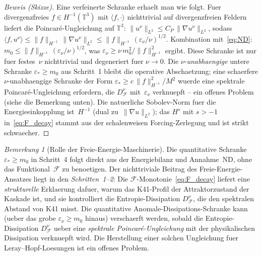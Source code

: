 \documentclass[12pt,a4paper]{article}
\theoremstyle{definition}
\theoremstyle{plain}
\theoremstyle{remark}
\newtheorem{remark}[definition]{Bemerkung}
\begin{document}
\begin{proof}[Beweis (Skizze)]
Eine verfeinerte Schranke erhaelt man wie folgt. Fuer divergenzfreies
$f \in H^{-1}(\mathbb{T}^3)$ mit $\langle f, \cdot\rangle$ nichttrivial
auf divergenzfreien Feldern liefert die Poincar\'e-Ungleichung auf
$\mathbb{T}^3$: $\|u^\nu\|_{L^2} \le C_P\,\|\nabla u^\nu\|_{L^2}$,
sodass
$\langle f, u^\nu \rangle
\le \|f\|_{H^{-1}}\,\|\nabla u^\nu\|_{L^2}
\le \|f\|_{H^{-1}}\,(\varepsilon_\nu/\nu)^{1/2}$.
Kombination mit~\eqref{eq:ND}:
$m_0 \le \|f\|_{H^{-1}}\,(\varepsilon_\nu/\nu)^{1/2}$, was
$\varepsilon_\nu \ge \nu\,m_0^2/\|f\|_{H^{-1}}^2$ ergibt. Diese
Schranke ist nur fuer festes~$\nu$ nichttrivial und degeneriert fuer
$\nu \to 0$.
Die $\nu$-\emph{unabhaengige} untere Schranke
$\varepsilon_* \ge m_0$ aus Schritt~1 bleibt die operative Abschaetzung;
eine schaerfere $\nu$-unabhaengige Schranke der Form
$\varepsilon_* \ge c\,\|f\|_{H^{-1}}^2 / M^2$
wuerde eine spektrale Poincar\'e-Ungleichung erfordern, die
$D_\mathcal{F}^\nu$ mit~$\varepsilon_\nu$ verknuepft -- ein offenes
Problem (siehe die Bemerkung unten).
Die natuerliche Sobolev-Norm fuer die Energieeinkopplung ist~$H^{-1}$
(dual zu~$\|\nabla u\|_{L^2}$); das $H^s$ mit $s > -1$
in~\eqref{eq:F_decay} stammt aus der schalenweisen Forcing-Zerlegung und
ist strikt schwaecher.

\end{proof}

\begin{remark}[Rolle der Freie-Energie-Maschinerie]
Die quantitative Schranke $\varepsilon_* \ge m_0$ in Schritt~4 folgt
direkt aus der Energiebilanz und Annahme~ND, ohne das
Funktional~$\mathcal{F}$ zu benoetigen. Der nichttriviale Beitrag des
Freie-Energie-Ansatzes liegt in den \emph{Schritten~1--2}: Die
$\mathcal{F}$-Monotonie~\eqref{eq:F_decay} liefert eine
\emph{strukturelle} Erklaerung dafuer, warum das K41-Profil der
Attraktorzustand der Kaskade ist, und sie kontrolliert die
Entropie-Dissipation $D_\mathcal{F}^\nu$, die den spektralen Abstand
von K41 misst. Die quantitative Anomale-Dissipations-Schranke kann
(ueber das grobe $\varepsilon_\nu \ge m_0$ hinaus) verschaerft werden,
sobald die Entropie-Dissipation $D_\mathcal{F}^\nu$ ueber eine
\emph{spektrale Poincar\'e-Ungleichung} mit der physikalischen
Dissipation verknuepft wird. Die Herstellung einer solchen Ungleichung
fuer Leray--Hopf-Loesungen ist ein offenes Problem.
\end{remark}
\end{document}
